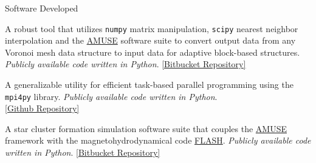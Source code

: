 \documentclass{resume} %
\begin{document}

\begin{rSection}{Software Developed}

\underline{}

\begin{description}[leftmargin=10em, style=nextline]

\item[\texttt{VorAMR}] A robust tool that utilizes \texttt{numpy} matrix manipulation, \texttt{scipy} nearest neighbor interpolation and the \href{https://www.amusecode.org/}{AMUSE} software suite to convert output data from any Voronoi mesh data structure to input data for adaptive block-based structures.  \textit{Publicly available code written in Python}. \href{https://bitbucket.org/torch-sf/torch/src/vorch/src/voramr/}{[Bitbucket Repository]}

\item[\texttt{PythonOpenMPI}] A generalizable utility for efficient task-based parallel programming using the \texttt{mpi4py} library. \textit{Publicly available code written in Python}.\\ \href{https://github.com/seanlabean/PythonOpenMPI}{[Github Repository]}

\end{description}

\underline{}

\begin{description}[leftmargin=10em, style=nextline]

\item[\texttt{Torch}] A star cluster formation simulation software suite that couples the \href{https://www.amusecode.org/}{AMUSE} framework with the magnetohydrodynamical code  \href{https://flash.rochester.edu/site/flashcode/user_support/}{FLASH}.  \textit{Publicly available code written in Python}. \href{https://bitbucket.org/torch-sf/torch/src/main/src/}{[Bitbucket Repository]}

\end{description}

\end{rSection}

\end{document}
